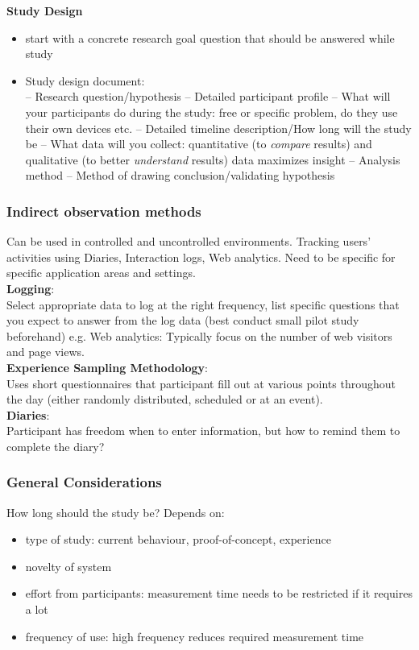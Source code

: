 \textbf{Study Design}
\begin{itemize}
\item start with a concrete research goal question that should be answered while study
\item Study design document:\\
-- Research question/hypothesis
-- Detailed participant profile
-- What will your participants do during the study: free or specific problem, do they use their own devices etc.
-- Detailed timeline description/How long will the study be
-- What data will you collect: quantitative (to \textit{compare} results) and qualitative (to better \textit{understand} results) data maximizes insight
-- Analysis method
-- Method of drawing conclusion/validating hypothesis
\end{itemize}

\subsubsection{Indirect observation methods}
Can be used in controlled and uncontrolled environments. Tracking users' activities using Diaries, Interaction logs, Web analytics. Need to be specific for specific application areas and settings.\\
\textbf{Logging}:\\
Select appropriate data to log at the right frequency, list specific questions that you expect to answer from the log data (best conduct small pilot study beforehand)
e.g. Web analytics: Typically focus on the number of web visitors and page views.\\

\textbf{Experience Sampling Methodology}:\\
Uses short questionnaires  that participant fill out at various points throughout the day (either randomly distributed, scheduled or at an event).\\

\textbf{Diaries}:\\
Participant has freedom when to enter information, but how to remind them to complete the diary?  

\subsubsection{General Considerations}
How long should the study be? Depends on:
\begin{itemize}
\item type of study: current behaviour, proof-of-concept, experience
\item novelty of system
\item effort from participants: measurement time needs to be restricted if it requires a lot
\item frequency of use: high frequency reduces required measurement time
\end{itemize}

